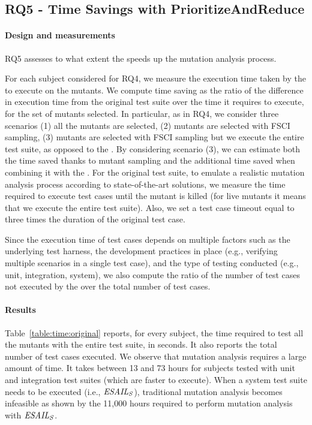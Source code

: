 \subsection{RQ5 - Time Savings with PrioritizeAndReduce}

\paragraph{Design and measurements}

RQ5 assesses to what extent  the \MPTS speeds up the mutation analysis process.


For each subject considered for RQ4, we measure the execution time taken by the \MPTS to execute on the mutants.
We compute time saving as the ratio of the difference in execution time from the original test suite over the time it requires to execute, for the set of mutants selected.
In particular, as in RQ4, we consider three scenarios (1) all the mutants are selected, (2) mutants are selected with FSCI sampling, (3) mutants are selected with FSCI sampling but we execute the entire test suite, as opposed to the \MPTS. By considering scenario (3), we can estimate both the time saved thanks to mutant sampling and the additional time saved when combining it with the \MPTS.
For the original test suite, to emulate a realistic mutation analysis process according to state-of-the-art solutions, we measure the time required to execute test cases until the mutant is killed (for live mutants it means that we execute the entire test suite). Also, we set a test case timeout equal to three times the duration of the original test case.

Since the execution time of test cases depends on multiple factors such as the underlying test harness, the development practices in place (e.g., verifying multiple scenarios in a single test case), and the type of testing conducted (e.g., unit, integration, system), we also compute 
the ratio of the number of test cases not executed by the \MPTS over the total number of test cases.

\paragraph{Results}

Table~\ref{table:time:original} reports, for every subject, the time required to test all the mutants with the entire test suite, in seconds. It also reports  the total number of test cases executed. 
We observe that mutation analysis requires a large amount of time. It takes between 13 and 73 hours for subjects tested with unit and integration test suites (which are faster to execute). When a system test suite needs to be executed (i.e., $\mathit{\emph{ESAIL}{}_S}$), traditional mutation analysis becomes infeasible as shown by the 11,000 hours required to perform mutation analysis with $\mathit{\emph{ESAIL}{}_S}$.

